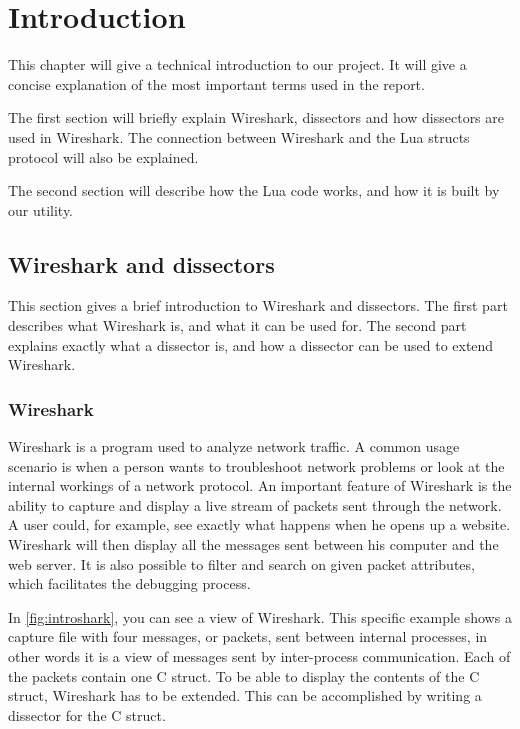 \chapter*{Introduction}

This chapter will give a technical introduction to our project.
It will give a concise explanation of the most important terms used in the report.

The first section will briefly explain Wireshark, dissectors and how dissectors are used in Wireshark.
The connection between Wireshark and the Lua structs protocol will also be explained.

The second section will describe how the Lua code works, and how it is built by our utility.

\section*{Wireshark and dissectors}
This section gives a brief introduction to Wireshark and dissectors.
The first part describes what Wireshark is, and what it can be used for.
The second part explains exactly what a dissector is, and how a dissector can be used to extend Wireshark.

\subsection*{Wireshark}
Wireshark is a program used to analyze network traffic. A common usage scenario is when a person wants to troubleshoot network problems or
look at the internal workings of a network protocol. An important feature of Wireshark is the ability to capture and display a live stream of packets sent through the network. 
A user could, for example, see exactly what happens when he opens up a website. Wireshark will then display all the messages
sent between his computer and the web server. It is also possible to filter and search on given packet attributes, which facilitates the debugging process.

In \autoref{fig:introshark}, you can see a view of Wireshark.
This specific example shows a capture file with four messages, or packets, sent between internal processes, in other words
it is a view of messages sent by inter-process communication. Each of the packets contain one C struct.
To be able to display the contents of the C struct, Wireshark has to be extended. 
This can be accomplished by writing a dissector for the C struct.

